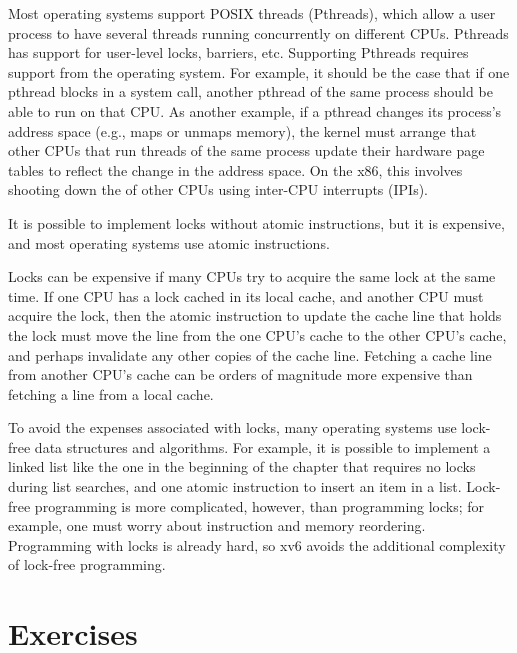 Most operating systems support POSIX threads (Pthreads), which allow a user
process to have several threads running concurrently on different CPUs.
Pthreads has support for user-level locks, barriers, etc.  Supporting Pthreads requires
support from the operating system. For example, it should be the case that if
one pthread blocks in a system call, another pthread of the same process should
be able to run on that CPU.  As another example, if a pthread changes its
process's address space (e.g., maps or unmaps memory), the kernel must arrange that
other CPUs that run threads of the same process update their hardware page
tables to reflect the change in the address space.  On the x86, this involves
shooting down the
of other CPUs using inter-CPU interrupts (IPIs).

It is possible to implement locks without atomic instructions, but it is
expensive, and most operating systems use atomic instructions.

Locks can be expensive if many CPUs try to acquire the same lock
at the same time.  If one CPU has a lock
cached in its local cache, and another CPU must acquire the lock, then the
atomic instruction to update the cache line that holds the lock must move the line
from the one CPU's cache to the other CPU's cache, and perhaps
invalidate any other copies of the cache line.  Fetching a cache line from
another CPU's cache can be orders of magnitude more expensive than
fetching a line from a local cache.

To avoid the expenses associated with locks, many operating systems use
lock-free data structures and algorithms.  For example, it is possible to
implement a linked list like the one in the beginning of the chapter that
requires no locks during list searches, and one atomic instruction to insert an
item in a list.  Lock-free programming is more complicated, however, than
programming locks; for example, one must worry about instruction and memory
reordering.  Programming with locks is already hard, so xv6 avoids the
additional complexity of lock-free programming.

\section{Exercises}

